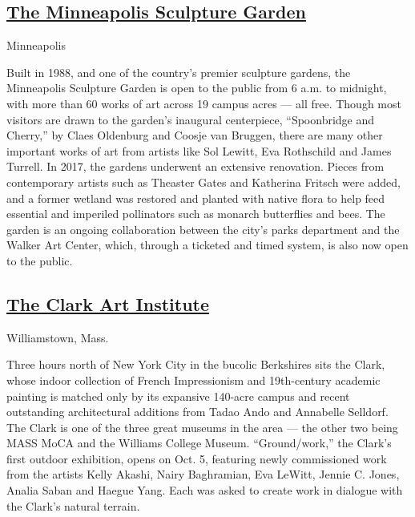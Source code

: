 \hypertarget{the-minneapolis-sculpture-garden}{%
\subsection{\texorpdfstring{\href{https://walkerart.org/visit/garden}{The
Minneapolis Sculpture
Garden}}{The Minneapolis Sculpture Garden}}\label{the-minneapolis-sculpture-garden}}

Minneapolis

Built in 1988, and one of the country's premier sculpture gardens, the
Minneapolis Sculpture Garden is open to the public from 6 a.m. to
midnight, with more than 60 works of art across 19 campus acres --- all
free. Though most visitors are drawn to the garden's inaugural
centerpiece, ``Spoonbridge and Cherry,'' by Claes Oldenburg and Coosje
van Bruggen, there are many other important works of art from artists
like Sol Lewitt, Eva Rothschild and James Turrell. In 2017, the gardens
underwent an extensive renovation. Pieces from contemporary artists such
as Theaster Gates and Katherina Fritsch were added, and a former wetland
was restored and planted with native flora to help feed essential and
imperiled pollinators such as monarch butterflies and bees. The garden
is an ongoing collaboration between the city's parks department and the
Walker Art Center, which, through a ticketed and timed system, is also
now open to the public.

\hypertarget{the-clark-art-institute}{%
\subsection{\texorpdfstring{\href{https://www.clarkart.edu/}{The Clark
Art
Institute}}{The Clark Art Institute}}\label{the-clark-art-institute}}

Williamstown, Mass.

Three hours north of New York City in the bucolic Berkshires sits the
Clark, whose indoor collection of French Impressionism and 19th-century
academic painting is matched only by its expansive 140-acre campus and
recent outstanding architectural additions from Tadao Ando and Annabelle
Selldorf. The Clark is one of the three great museums in the area ---
the other two being MASS MoCA and the Williams College Museum.
``Ground/work,'' the Clark's first outdoor exhibition, opens on Oct. 5,
featuring newly commissioned work from the artists Kelly Akashi, Nairy
Baghramian, Eva LeWitt, Jennie C. Jones, Analia Saban and Haegue Yang.
Each was asked to create work in dialogue with the Clark's natural
terrain.

